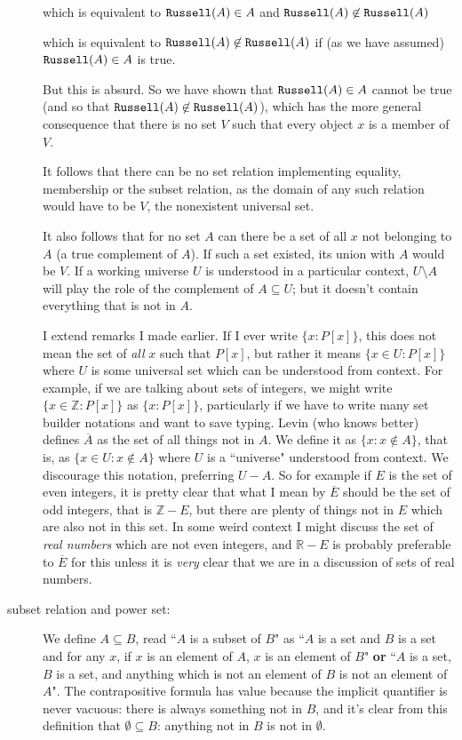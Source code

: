 \documentclass[12pt]{article}
\begin{document}
\begin{description}
which is equivalent to ${\tt Russell}(A) \in A$ and ${\tt Russell}(A) \not\in {\tt Russell}(A)$

which is equivalent to ${\tt Russell}(A) \not\in {\tt Russell}(A)$ if (as we have assumed) ${\tt Russell}(A)\in A$ is true.

But this is absurd.  So we have shown that ${\tt Russell}(A)\in A$  cannot be true (and so that ${\tt Russell}(A) \not\in {\tt Russell}(A)$), which has the more general consequence
that there is no set $V$ such that every object $x$ is a member of $V$.

It follows that there can be no set relation implementing equality, membership or the subset relation, as the domain of any such relation would have to be $V$, the nonexistent universal set.

It also follows that for no set $A$ can there be a set of all $x$ not belonging to $A$ (a true complement of $A$).
If such a set existed, its union with $A$ would be $V$.  If a working universe $U$ is understood in a particular context,
$U \setminus A$ will play the role of the complement of $A \subseteq U$;  but it doesn't contain everything that is not in $A$.


I extend remarks I made earlier.  If I ever write $\{x:P[x]\}$, this does not mean the set of {\em all\/} $x$ such that $P[x]$, but rather it means $\{x\in U:P[x]\}$  where $U$ is some universal set which can be understood from context.  For example, if we are talking about sets of integers, we might write $\{x\in \mathbb Z:P[x]\}$ as $\{x:P[x]\}$, particularly if we have to write many set builder notations and want to save typing.
Levin (who knows better) defines $\overline{A}$ as the set of all things not in $A$.  We define it as $\{x:x \not\in A\}$, that is, as $\{x\in U:x \not\in A\}$ where $U$ is a ``universe" understood from context.
We discourage this notation, preferring $U - A$.  So for example if $E$ is the set of even integers, it is pretty clear that what I mean by $\overline{E}$ should be the set of odd integers, that is $\mathbb Z - E$, but there are plenty of things not in $E$ which are also not in this set.  In some weird context I might discuss the set of {\em real numbers\/} which are not even integers, and $\mathbb R - E$ is probably preferable to $\overline{E}$ for this unless it is {\em very\/} clear that we are in a discussion of sets of real numbers.


\item[subset relation and power set:]  We define $A \subseteq B$, read ``$A$ is a subset of $B$" as  ``$A$ is a set and $B$ is a set and for any $x$, if $x$ is an element of $A$, $x$ is an element of $B$" {\bf or}  ``$A$ is a set, $B$ is a set, and anything which is not an element of $B$ is not an element of $A$".  The contrapositive formula has value because the implicit quantifier is never vacuous:  there is always something not in $B$, and it's clear from this definition that $\emptyset \subseteq B$:  anything not in $B$ is not in $\emptyset$.


\end{description}
\end{document}
